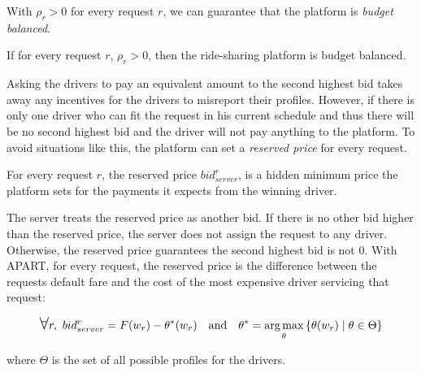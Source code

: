 With $\rho_r > 0$ for every request $r$, we can guarantee that the platform is \emph{budget balanced}.

\begin{lemma}
If for every request $r$, $\rho_r > 0$, then the ride-sharing platform is budget balanced.
\end{lemma}

Asking the drivers to pay an equivalent amount to the second highest bid takes away any incentives for the drivers to misreport their profiles. However, if there is only one driver who can fit the request in his current schedule and thus there will be no second highest bid and the driver will not pay anything to the platform. To avoid situations like this, the platform can set a \emph{reserved price} for every request.

\begin{definition} 
For every request $r$, the reserved price $bid_{server}^r$, is a hidden minimum price the platform sets for the payments it expects from the winning driver.
\end{definition}

The server treats the reserved price as another bid. If there is no other bid higher than the reserved price, the server does not assign the request to any driver. Otherwise, the reserved price guarantees the second highest bid is not 0. With APART, for every request, the reserved price is the difference between the requests default fare and the cost of the most expensive driver servicing that request:

\begin{equation*}
\bigforall r, \ bid_{server}^r = F(w_r) - \theta^*(w_r) \quad \textrm{and} \quad \theta^* = \argmax_\theta \left\lbrace \theta(w_r) \mid \theta \in \Theta \right\rbrace 
\end{equation*}

\noindent where $\Theta$ is the set of all possible profiles for the drivers.